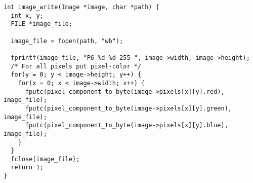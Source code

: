 \begin{lstlisting}[style=Cstyle, caption=light struct]
int image_write(Image *image, char *path) {
  int x, y;
  FILE *image_file;

  image_file = fopen(path, "wb");
  
  fprintf(image_file, "P6 %d %d 255 ", image->width, image->height);
  /* For all pixels put pixel-color */
  for(y = 0; y < image->height; y++) {
    for(x = 0; x < image->width; x++) {
      fputc(pixel_component_to_byte(image->pixels[x][y].red), image_file);
      fputc(pixel_component_to_byte(image->pixels[x][y].green), image_file);
      fputc(pixel_component_to_byte(image->pixels[x][y].blue), image_file);
    }
  }
  fclose(image_file);
  return 1;
}
\end{lstlisting}


